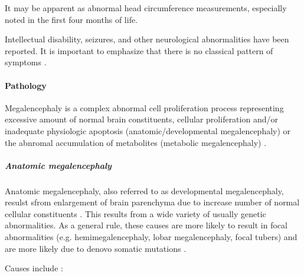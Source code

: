 It may be apparent as abnormal head circumference measurements, especially noted in the first four months of life.

Intellectual disability, seizures, and other neurological abnormalities have been reported. It is important to emphasize that there is no classical pattern of symptoms .

\paragraph{Pathology}

Megalencephaly is a complex abnormal cell proliferation process representing excessive amount of normal brain constituents, cellular proliferation and/or inadequate physiologic apoptosis (anatomic/developmental megalencephaly) or the abnromal accumulation of metabolites (metabolic megalencephaly) .

\subparagraph{Anatomic megalencephaly}

Anatomic megalencephaly, also referred to as developmental megalencephaly, resulst sfrom enlargement of brain parenchyma due to increase number of normal cellular constituents . This results from a wide variety of usually genetic abnormalities. As a general rule, these causes are more likely to result in focal abnormalities (e.g. hemimegalencephaly, lobar megalencephaly, focal tubers) and are more likely due to denovo somatic mutations .

Causes include :

